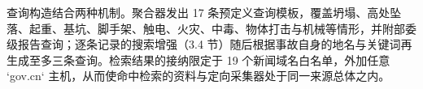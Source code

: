 \documentclass[11pt]{article}
\begin{document}
{\cjkfont 查\allowbreak 询\allowbreak 构\allowbreak 造\allowbreak 结\allowbreak 合\allowbreak 两\allowbreak 种\allowbreak 机\allowbreak 制\allowbreak 。\allowbreak 聚\allowbreak 合\allowbreak 器\allowbreak 发\allowbreak 出} 17 {\cjkfont 条\allowbreak 预\allowbreak 定\allowbreak 义\allowbreak 查\allowbreak 询\allowbreak 模\allowbreak 板\allowbreak ，\allowbreak 覆\allowbreak 盖\allowbreak 坍\allowbreak 塌\allowbreak 、\allowbreak 高\allowbreak 处\allowbreak 坠\allowbreak 落\allowbreak 、\allowbreak 起\allowbreak 重\allowbreak 、\allowbreak 基\allowbreak 坑\allowbreak 、\allowbreak 脚\allowbreak 手\allowbreak 架\allowbreak 、\allowbreak 触\allowbreak 电\allowbreak 、\allowbreak 火\allowbreak 灾\allowbreak 、\allowbreak 中\allowbreak 毒\allowbreak 、\allowbreak 物\allowbreak 体\allowbreak 打\allowbreak 击\allowbreak 与\allowbreak 机\allowbreak 械\allowbreak 等\allowbreak 情\allowbreak 形\allowbreak ，\allowbreak 并\allowbreak 附\allowbreak 部\allowbreak 委\allowbreak 级\allowbreak 报\allowbreak 告\allowbreak 查\allowbreak 询\allowbreak ；\allowbreak 逐\allowbreak 条\allowbreak 记\allowbreak 录\allowbreak 的\allowbreak 搜\allowbreak 索\allowbreak 增\allowbreak 强\allowbreak （}3.4 {\cjkfont 节\allowbreak ）\allowbreak 随\allowbreak 后\allowbreak 根\allowbreak 据\allowbreak 事\allowbreak 故\allowbreak 自\allowbreak 身\allowbreak 的\allowbreak 地\allowbreak 名\allowbreak 与\allowbreak 关\allowbreak 键\allowbreak 词\allowbreak 再\allowbreak 生\allowbreak 成\allowbreak 至\allowbreak 多\allowbreak 三\allowbreak 条\allowbreak 查\allowbreak 询\allowbreak 。\allowbreak 检\allowbreak 索\allowbreak 结\allowbreak 果\allowbreak 的\allowbreak 接\allowbreak 纳\allowbreak 限\allowbreak 定\allowbreak 于} 19 {\cjkfont 个\allowbreak 新\allowbreak 闻\allowbreak 域\allowbreak 名\allowbreak 白\allowbreak 名\allowbreak 单\allowbreak ，\allowbreak 外\allowbreak 加\allowbreak 任\allowbreak 意} `gov.\allowbreak{}cn` {\cjkfont 主\allowbreak 机\allowbreak ，\allowbreak 从\allowbreak 而\allowbreak 使\allowbreak 命\allowbreak 中\allowbreak 检\allowbreak 索\allowbreak 的\allowbreak 资\allowbreak 料\allowbreak 与\allowbreak 定\allowbreak 向\allowbreak 采\allowbreak 集\allowbreak 器\allowbreak 处\allowbreak 于\allowbreak 同\allowbreak 一\allowbreak 来\allowbreak 源\allowbreak 总\allowbreak 体\allowbreak 之\allowbreak 内\allowbreak 。}
\end{document}
